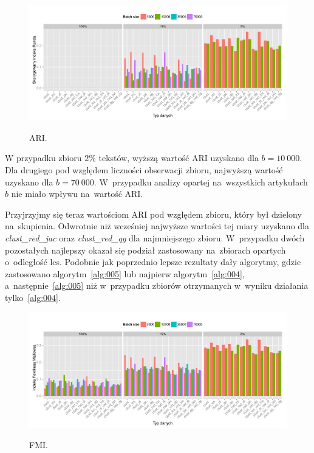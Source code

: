 \documentclass{praca1}
\begin{document}
\begin{figure}[!h]
  \centering
  \includegraphics[width=400pt]{plot13.pdf}\\
  \caption{ARI.}\label{plot:008}
\end{figure}

W przypadku zbioru $2\%$ tekstów, wyższą wartość ARI uzyskano dla $b = 10\ 000$. Dla drugiego pod względem liczności obserwacji zbioru, najwyższą wartość uzyskano dla $b=70\ 000$. W~przypadku analizy opartej na~wszystkich artykułach $b$ nie miało wpływu na~wartość ARI.

Przyjrzyjmy się teraz wartościom ARI pod względem zbioru, który był dzielony na~skupienia. Odwrotnie niż wcześniej najwyższe wartości tej miary uzyskano dla \emph{clust\_red\_jac} oraz \emph{clust\_red\_qg} dla najmniejszego zbioru. W~przypadku dwóch pozostałych najlepszy okazał się podział zastosowany na~zbiorach opartych o~odległość lcs. Podobnie jak poprzednio lepsze rezultaty dały algorytmy, gdzie zastosowano algorytm~\ref{alg:005} lub najpierw algorytm~\ref{alg:004}, a~następnie~\ref{alg:005} niż w~przypadku zbiorów otrzymanych w~wyniku działania tylko~\ref{alg:004}.

\begin{figure}[!h]
  \centering
  \includegraphics[width=400pt]{plot15.pdf}\\
  \caption{FMI.}\label{plot:010}
\end{figure}
\end{document}
